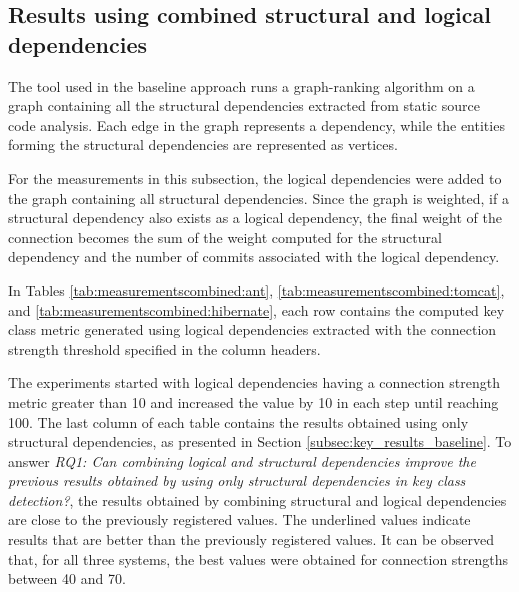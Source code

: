 \subsection{Results using combined structural and logical dependencies}
\label{subsec:key_results_combined}

\hspace{4em}The tool used in the baseline approach runs a graph-ranking algorithm on a graph containing all the structural dependencies extracted from static source code analysis. Each edge in the graph represents a dependency, while the entities forming the structural dependencies are represented as vertices.

For the measurements in this subsection, the logical dependencies were added to the graph containing all structural dependencies. Since the graph is weighted, if a structural dependency also exists as a logical dependency, the final weight of the connection becomes the sum of the weight computed for the structural dependency and the number of commits associated with the logical dependency.

In Tables \ref{tab:measurementscombined:ant}, \ref{tab:measurementscombined:tomcat}, and \ref{tab:measurementscombined:hibernate}, each row contains the computed key class metric generated using logical dependencies extracted with the connection strength threshold specified in the column headers.

The experiments started with logical dependencies having a connection strength metric greater than 10 and increased the value by 10 in each step until reaching 100. The last column of each table contains the results obtained using only structural dependencies, as presented in Section \ref{subsec:key_results_baseline}. To answer \textit{RQ1: Can combining logical and structural dependencies improve the previous results obtained by using only structural dependencies in key class detection?}, the results obtained by combining structural and logical dependencies are close to the previously registered values. The underlined values indicate results that are better than the previously registered values. It can be observed that, for all three systems, the best values were obtained for connection strengths between 40 and 70.

